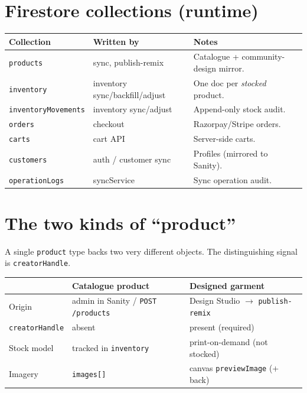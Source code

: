 \documentclass[11pt,a4paper]{report}
\newcommand{\code}[1]{\texttt{#1}}
\begin{document}
\section{Firestore collections (runtime)}
\begin{center}\small
\begin{tabular}{@{}p{3.2cm}p{4.0cm}p{6.6cm}@{}}
\toprule
\textbf{Collection} & \textbf{Written by} & \textbf{Notes}\\
\midrule
\code{products} & sync, publish-remix & Catalogue + community-design mirror.\\
\code{inventory} & inventory sync/backfill/adjust & One doc per \emph{stocked} product.\\
\code{inventoryMovements} & inventory sync/adjust & Append-only stock audit.\\
\code{orders} & checkout & Razorpay/Stripe orders.\\
\code{carts} & cart API & Server-side carts.\\
\code{customers} & auth / customer sync & Profiles (mirrored to Sanity).\\
\code{operationLogs} & syncService & Sync operation audit.\\
\bottomrule
\end{tabular}
\end{center}

\section{The two kinds of ``product''}
A single \code{product} type backs two very different objects. The distinguishing signal
is \code{creatorHandle}.

\begin{center}\small
\begin{tabular}{@{}lll@{}}
\toprule
 & \textbf{Catalogue product} & \textbf{Designed garment}\\
\midrule
Origin & admin in Sanity / \code{POST /products} & Design Studio $\rightarrow$ \code{publish-remix}\\
\code{creatorHandle} & absent & present (required)\\
Stock model & tracked in \code{inventory} & print-on-demand (not stocked)\\
Imagery & \code{images[]} & canvas \code{previewImage} (+ back)\\
\bottomrule
\end{tabular}
\end{center}
\end{document}
